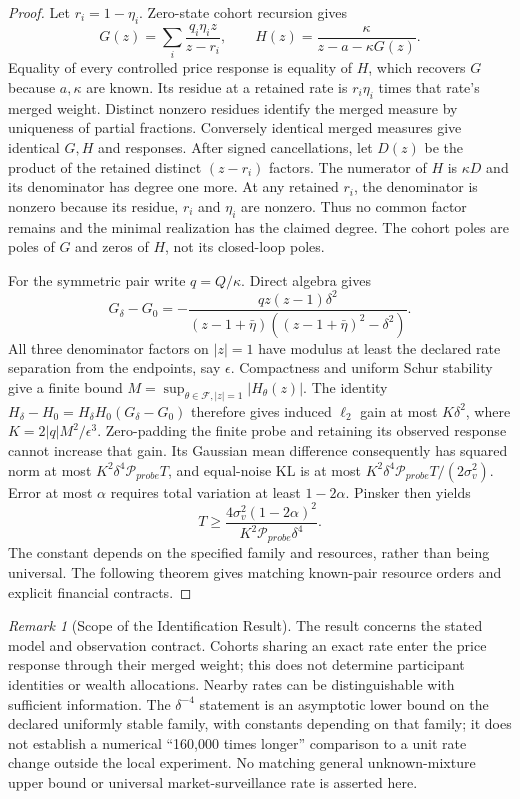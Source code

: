 \documentclass[12pt]{article}
\theoremstyle{definition}
\theoremstyle{remark}
\newtheorem{remark}[theorem]{Remark}
\begin{document}
\begin{proof}
Let $r_i=1-\eta_i$. Zero-state cohort recursion gives
\[G(z)=\sum_i\frac{q_i\eta_i z}{z-r_i},\qquad H(z)=\frac{\kappa}{z-a-\kappa G(z)}.\]
Equality of every controlled price response is equality of $H$, which recovers $G$ because $a,\kappa$ are known. Its residue at a retained rate is $r_i\eta_i$ times that rate's merged weight. Distinct nonzero residues identify the merged measure by uniqueness of partial fractions. Conversely identical merged measures give identical $G,H$ and responses. After signed cancellations, let $D(z)$ be the product of the retained distinct $(z-r_i)$ factors. The numerator of $H$ is $\kappa D$ and its denominator has degree one more. At any retained $r_i$, the denominator is nonzero because its residue, $r_i$ and $\eta_i$ are nonzero. Thus no common factor remains and the minimal realization has the claimed degree. The cohort poles are poles of $G$ and zeros of $H$, not its closed-loop poles.

For the symmetric pair write $q=Q/\kappa$. Direct algebra gives
\[G_\delta-G_0=-\frac{qz(z-1)\delta^2}{(z-1+\bar\eta)((z-1+\bar\eta)^2-\delta^2)}.\]
All three denominator factors on $|z|=1$ have modulus at least the declared rate separation from the endpoints, say $\epsilon$. Compactness and uniform Schur stability give a finite bound $M=\sup_{\theta\in\mathcal F,|z|=1}|H_\theta(z)|$. The identity $H_\delta-H_0=H_\delta H_0(G_\delta-G_0)$ therefore gives induced $\ell_2$ gain at most $K\delta^2$, where $K=2|q|M^2/\epsilon^3$. Zero-padding the finite probe and retaining its observed response cannot increase that gain. Its Gaussian mean difference consequently has squared norm at most $K^2\delta^4\mathcal P_{probe}T$, and equal-noise KL is at most $K^2\delta^4\mathcal P_{probe}T/(2\sigma_v^2)$. Error at most $\alpha$ requires total variation at least $1-2\alpha$. Pinsker then yields
\[T\ge\frac{4\sigma_v^2(1-2\alpha)^2}{K^2\mathcal P_{probe}\delta^4}.\]
The constant depends on the specified family and resources, rather than being universal. The following theorem gives matching known-pair resource orders and explicit financial contracts.
\end{proof}

\begin{remark}[Scope of the Identification Result]
The result concerns the stated model and observation contract. Cohorts sharing an exact rate enter the price response through their merged weight; this does not determine participant identities or wealth allocations. Nearby rates can be distinguishable with sufficient information. The $\delta^{-4}$ statement is an asymptotic lower bound on the declared uniformly stable family, with constants depending on that family; it does not establish a numerical ``160,000 times longer'' comparison to a unit rate change outside the local experiment. No matching general unknown-mixture upper bound or universal market-surveillance rate is asserted here.
\end{remark}
\end{document}

